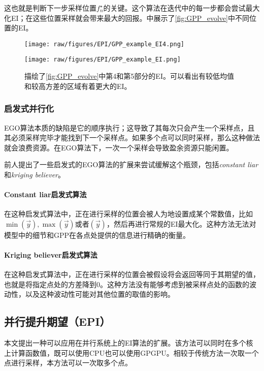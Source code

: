 \documentclass[index]{subfiles}
\begin{document}
这也就是判断下一步采样位置$f_{n}^{\star}$的关键。这个算法在迭代中的每一步都会尝试最大化EI；在这些位置采样就会带来最大的回报。中展示了\cref{fig:GPP_evolve}中不同位置的EI。

\begin{figure}[hpt]
 	\centerline{\texttt{[image: raw/figures/EPI/GPP\_example\_EI4.png]}}
    \centerline{\texttt{[image: raw/figures/EPI/GPP\_example\_EI.png]}}
    \caption[GPP的EI的演变]{描绘了\cref{fig:GPP_evolve}中第4和第5部分的EI。可以看出有较低均值和较高方差的区域有着更大的EI。}
 	\label{fig:GPP_EI_evolve}
\end{figure}

\subsubsection{启发式并行化}

EGO算法本质的缺陷是它的顺序执行；这导致了其每次只会产生一个采样点，且其必须采样完毕才能找到下一个采样点。如果多个点可以同时采样，那么这种做法就会浪费资源。在EGO算法下，一次一个采样会导致盈余资源只能闲置。

前人提出了一些启发式的EGO算法的扩展来尝试缓解这个瓶颈，包括{\it constant liar}和{\it kriging believer}\cite{Ginsbourger2008}。

\paragraph{Constant liar启发式算法}

在这种启发式算法中，正在进行采样的位置会被人为地设置成某个常数值，比如$\min(\vec{y}), \max(\vec{y})$或者$(\vec{y})$，然后再进行常规的EI最大化。这种方法无法对模型中的细节和GPP在各点处提供的信息进行精确的衡量。

\paragraph{Kriging believer启发式算法}

在这种启发式算法中，正在进行采样的位置会被假设将会返回等同于其期望的值，也就是将指定点处的方差降到0。这种方法没有能够考虑到被采样点处的函数的波动性，以及这种波动性可能对其他位置的取值的影响。

\subsection{并行提升期望（EPI）}

本文提出一种可以应用在并行系统上的EI算法的扩展。该方法可以同时在多个核上计算函数值，既可以使用CPU也可以使用GPGPU。相较于传统方法一次取一个点进行采样，本方法可以一次取多个点。
\end{document}
